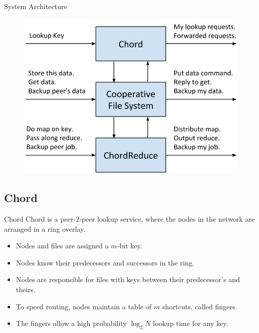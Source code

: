 \documentclass[11pt]{beamer}
\begin{document}
\begin{frame}{System Architecture}
\begin{figure}
    \includegraphics[width=0.8\linewidth]{CR_architecture}

\end{figure}
\end{frame}


\subsection{Chord}

\begin{frame}{Chord}
Chord is a peer-2-peer lookup service, where the nodes in the network are arranged in a ring overlay.
\begin{itemize}
	\item Nodes and files are assigned a $m$-bit key.
	\item Nodes know their predecessors and successors in the ring.
	\item Nodes are responsible for files with keys between their predecessor's and theirs.
	\item To speed routing, nodes maintain a table of $m$ shortcuts, called fingers.
	\item The fingers allow a high probability $\log_{2} N$ lookup time for any key.
	
\end{itemize}


\end{frame}
\end{document}
